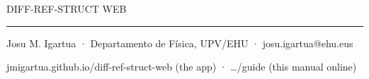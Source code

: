 \begin{titlepage}
\raggedright
\vspace*{3cm}
{\sffamily\small\color{drsgreen}\MakeUppercase{diff-ref-struct Web}\par}
\vspace{6pt}
{\color{drsgreen}\rule{3cm}{1.2pt}\par}
\vspace{18pt}
{\drshead\fontsize{34}{40}\selectfont \doctitle\par}
\vspace{14pt}
{\drsserif\Large\color{drssoft} \docsub\par}
\vfill
{\small\color{drssoft}
\docaudience\par
\vspace{10pt}
\docversion\par
Josu M. Igartua · Departamento de Física, UPV/EHU · josu.igartua@ehu.eus\par
\vspace{4pt}
\textcolor{drsgreen}{jmigartua.github.io/diff-ref-struct-web} (the app) · \textcolor{drsgreen}{…/guide} (this manual online)\par}
\end{titlepage}
\setcounter{tocdepth}{1}
{\hypersetup{linkcolor=drsink}\tableofcontents}
\clearpage
